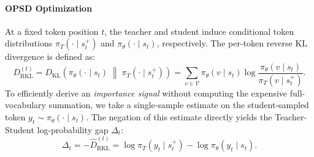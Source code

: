 \documentclass{llmxive}
\begin{document}
\paragraph{OPSD Optimization}

At a fixed token position $t$, the teacher and student induce conditional token distributions $\pi_T(\cdot \mid s_t^{+})$ and $\pi_{\theta}(\cdot \mid s_t)$, respectively. The per-token reverse KL divergence is defined as:
$$
D_{\mathrm{RKL}}^{(t)} = D_{\mathrm{KL}}\!\left( \pi_{\theta}(\cdot \mid s_t) \;\middle\|\; \pi_T(\cdot \mid s_t^{+}) \right) = \sum_{v \in \mathcal{V}} \pi_{\theta}(v \mid s_t) \log \frac{\pi_{\theta}(v \mid s_t)}{\pi_T(v \mid s_t^{+})}.
$$
To efficiently derive an \emph{importance signal} without computing the expensive full-vocabulary summation, we take a single-sample estimate on the student-sampled token $y_t \sim \pi_{\theta}(\cdot \mid s_t)$. The negation of this estimate directly yields the Teacher-Student log-probability gap $\Delta_t$:
$$
\Delta_t = -\widehat{D}_{\mathrm{RKL}}^{(t)} = \log \pi_T(y_t \mid s_t^{+}) - \log \pi_{\theta}(y_t \mid s_t).
$$
\end{document}

